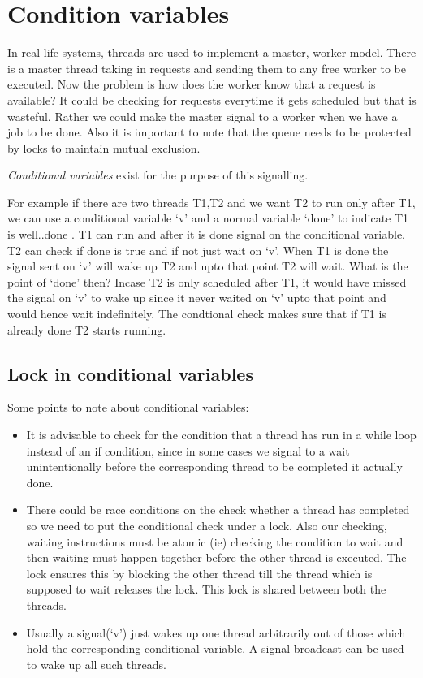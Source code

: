 \documentclass[12pt]{article}
\newcommand{\tbox}[1]{\noindent\fbox{\parbox{\textwidth}{#1}}}
\begin{document}
\noindent\tbox{
    \begin{center}
    \textbf{\Huge Lecture 24}
    \end{center}
}
\section{Condition variables}
In real life systems, threads are used to implement a master, worker model. There is a master thread taking in requests and sending them to any free worker to be executed.
Now the problem is how does the worker know that a request is available? It could be checking for requests everytime it gets scheduled but that is wasteful. Rather we could make the master
signal to a worker when we have a job to be done. Also it is important to note that the queue needs to be protected by locks to maintain mutual exclusion. 

\textit{Conditional variables} exist for the purpose of this signalling.

For example if there are two threads T1,T2 and we want T2 to run only after T1, we can use a conditional variable `v' and a normal variable `done' to indicate T1 is well..done . T1 can run and after it is done signal on the conditional variable.
T2 can check if done is true and if not just wait on `v'. When T1 is done the signal sent on `v' will wake up T2 and upto that point T2 will wait. What is the point of `done' then? Incase T2 is only scheduled after T1, it would have missed the signal on `v' to wake up since it never waited on `v' upto that 
point and would hence wait indefinitely. The condtional check makes sure that if T1 is already done T2 starts running.


\subsection{Lock in conditional variables}
Some points to note about conditional variables:
\begin{itemize}[topsep=0pt, partopsep=0pt, itemsep=0pt, parsep=0pt]
    \item It is advisable to check for the condition that a thread has run in a while loop instead of an if condition, since in some cases we signal to a wait unintentionally before the corresponding thread to be completed it actually done. 
    \item There could be race conditions on the check whether a thread has completed so we need to put the conditional check under a lock. Also our checking, waiting instructions must be atomic (ie) checking the condition to wait and then waiting must happen together before the other thread is executed. The lock ensures this by blocking the other thread till the thread which is supposed to wait releases the lock. This lock is shared between both the threads.
    \item Usually a signal(`v') just wakes up one thread arbitrarily out of those which hold the corresponding conditional variable. A signal broadcast can be used to wake up all such threads. 
\end{itemize}
\end{document}
